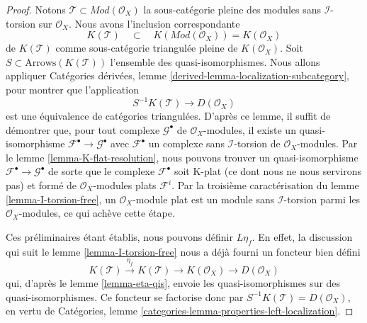 \begin{proof}

Notons $\mathcal{T} \subset \textit{Mod}(\mathcal{O}_X)$ la sous-catégorie pleine des modules sans $\mathcal{I}$-torsion sur $\mathcal{O}_X$. Nous avons l'inclusion correspondante
$$
K(\mathcal{T})
\quad\subset\quad
K(\textit{Mod}(\mathcal{O}_X)) = K(\mathcal{O}_X)
$$
de $K(\mathcal{T})$ comme sous-catégorie triangulée pleine de $K(\mathcal{O}_X)$. Soit $S \subset \text{Arrows}(K(\mathcal{T}))$ l'ensemble des quasi-isomorphismes. Nous allons appliquer Catégories dérivées, lemme \ref{derived-lemma-localization-subcategory},
pour montrer que l'application
$$
S^{-1}K(\mathcal{T}) \longrightarrow D(\mathcal{O}_X)
$$
est une équivalence de catégories triangulées. D'après ce lemme, il suffit de démontrer que, pour tout complexe $\mathcal{G}^\bullet$ de
$\mathcal{O}_X$-modules, il existe un quasi-isomorphisme $\mathcal{F}^\bullet \to \mathcal{G}^\bullet$
avec $\mathcal{F}^\bullet$
un complexe sans $\mathcal{I}$-torsion de $\mathcal{O}_X$-modules. Par le lemme \ref{lemma-K-flat-resolution}, nous pouvons trouver un quasi-isomorphisme
$\mathcal{F}^\bullet \to \mathcal{G}^\bullet$ de sorte que le complexe
$\mathcal{F}^\bullet$ soit K-plat (ce dont nous ne nous servirons pas) et formé de $\mathcal{O}_X$-modules plats $\mathcal{F}^i$. Par la troisième caractérisation du lemme \ref{lemma-I-torsion-free},
un $\mathcal{O}_X$-module plat est un module sans
$\mathcal{I}$-torsion parmi les $\mathcal{O}_X$-modules, ce qui achève cette étape.

\medskip\noindent

Ces préliminaires étant établis, nous pouvons définir $L\eta_f$. En effet, la discussion qui suit le lemme \ref{lemma-I-torsion-free}
nous a déjà fourni un foncteur bien défini
$$
K(\mathcal{T}) \xrightarrow{\eta_f} K(\mathcal{T}) \to
K(\mathcal{O}_X) \to D(\mathcal{O}_X)
$$
qui, d'après le lemme \ref{lemma-eta-qis}, envoie les quasi-isomorphismes sur des quasi-isomorphismes. Ce foncteur se factorise donc par
$S^{-1}K(\mathcal{T}) = D(\mathcal{O}_X)$, en vertu de Catégories, lemme \ref{categories-lemma-properties-left-localization}.

\end{proof}

\noindent

